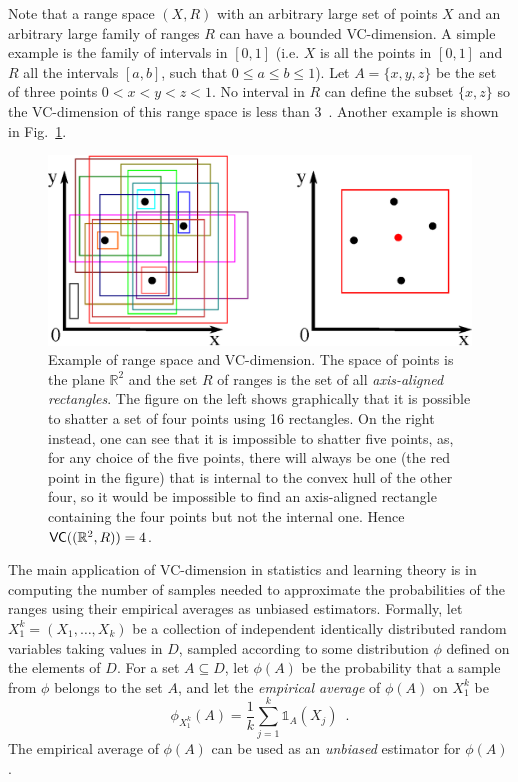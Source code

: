 \ifproof
Note that a range space $(X,R)$ with an arbitrary large set of points $X$ and
an arbitrary large family of ranges $R$ can have a bounded VC-dimension. A simple
example is the family of intervals in $[0,1]$ (i.e. $X$ is all the points in
$[0,1]$ and $R$ all the intervals $[a,b]$, such that $0\leq a\leq b\leq 1$). Let
$A=\{x,y,z\}$ be the set of three points $0<x<y<z<1$. No interval in $R$ can
define the subset $\{x,z\}$ so the VC-dimension of this range space is less than
3~\citep[Lemma 10.3.1]{Matousek02}. Another example is shown in
Fig.~\ref{fig:rectangles}.
\begin{figure}[ht]
  \centering
  \includegraphics[width=.7\textwidth,keepaspectratio]{figures/rectangles}
  \caption{Example of range space and VC-dimension. The space of points is the
  plane $\mathbb{R}^2$ and the set $R$ of ranges is the set of all
  \emph{axis-aligned rectangles}. The figure on the left shows graphically that
  it is possible to shatter a set of four points using 16 rectangles. On the
  right instead, one can see that it is impossible to shatter five points, as,
  for any choice of the five points, there will always be one (the red point in
  the figure) that is internal to the convex hull of the other four, so it would
  be impossible to find an axis-aligned rectangle containing the four points
  but not the internal one. Hence $\mathsf{VC}((\mathbb{R}^2,R))=4$.}
  \label{fig:rectangles}
\end{figure}
\fi

The main application of VC-dimension in statistics and learning
theory is in computing the number of samples needed to approximate the
probabilities of the ranges using their empirical averages as
unbiased estimators. Formally, let $X_1^k=(X_1,\dotsc,X_k)$ be a collection of
independent identically distributed random variables taking values in $D$,
sampled according to some distribution $\phi$ defined on the elements of $D$.
For a set $A\subseteq D$, let $\phi(A)$ be the probability that a sample from
$\phi$ belongs to the set $A$, and let the \emph{empirical average} of $\phi(A)$
on $X_1^k$ be 
\[
\phi_{X_1^k}(A)=\frac{1}{k}\sum_{j=1}^k\mathds{1}_A(X_j)\enspace.%
\]
The empirical average of $\phi(A)$ can be used as an \emph{unbiased} estimator
for $\phi(A)$.

